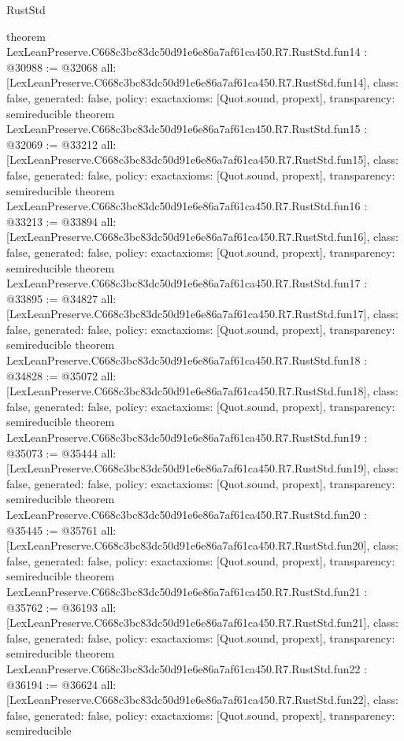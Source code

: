 \begin{lexlean}{RustStd}
\begin{coremodule}
{}
theorem LexLeanPreserve.C668c3bc83dc50d91e6e86a7af61ca450.R7.RustStd.fun14 : @30988 := @32068 {
  all: [LexLeanPreserve.C668c3bc83dc50d91e6e86a7af61ca450.R7.RustStd.fun14],
  class: false,
  generated: false,
  policy: exact{axioms: [Quot.sound, propext]},
  transparency: semireducible
}
theorem LexLeanPreserve.C668c3bc83dc50d91e6e86a7af61ca450.R7.RustStd.fun15 : @32069 := @33212 {
  all: [LexLeanPreserve.C668c3bc83dc50d91e6e86a7af61ca450.R7.RustStd.fun15],
  class: false,
  generated: false,
  policy: exact{axioms: [Quot.sound, propext]},
  transparency: semireducible
}
theorem LexLeanPreserve.C668c3bc83dc50d91e6e86a7af61ca450.R7.RustStd.fun16 : @33213 := @33894 {
  all: [LexLeanPreserve.C668c3bc83dc50d91e6e86a7af61ca450.R7.RustStd.fun16],
  class: false,
  generated: false,
  policy: exact{axioms: [Quot.sound, propext]},
  transparency: semireducible
}
theorem LexLeanPreserve.C668c3bc83dc50d91e6e86a7af61ca450.R7.RustStd.fun17 : @33895 := @34827 {
  all: [LexLeanPreserve.C668c3bc83dc50d91e6e86a7af61ca450.R7.RustStd.fun17],
  class: false,
  generated: false,
  policy: exact{axioms: [Quot.sound, propext]},
  transparency: semireducible
}
theorem LexLeanPreserve.C668c3bc83dc50d91e6e86a7af61ca450.R7.RustStd.fun18 : @34828 := @35072 {
  all: [LexLeanPreserve.C668c3bc83dc50d91e6e86a7af61ca450.R7.RustStd.fun18],
  class: false,
  generated: false,
  policy: exact{axioms: [Quot.sound, propext]},
  transparency: semireducible
}
theorem LexLeanPreserve.C668c3bc83dc50d91e6e86a7af61ca450.R7.RustStd.fun19 : @35073 := @35444 {
  all: [LexLeanPreserve.C668c3bc83dc50d91e6e86a7af61ca450.R7.RustStd.fun19],
  class: false,
  generated: false,
  policy: exact{axioms: [Quot.sound, propext]},
  transparency: semireducible
}
theorem LexLeanPreserve.C668c3bc83dc50d91e6e86a7af61ca450.R7.RustStd.fun20 : @35445 := @35761 {
  all: [LexLeanPreserve.C668c3bc83dc50d91e6e86a7af61ca450.R7.RustStd.fun20],
  class: false,
  generated: false,
  policy: exact{axioms: [Quot.sound, propext]},
  transparency: semireducible
}
theorem LexLeanPreserve.C668c3bc83dc50d91e6e86a7af61ca450.R7.RustStd.fun21 : @35762 := @36193 {
  all: [LexLeanPreserve.C668c3bc83dc50d91e6e86a7af61ca450.R7.RustStd.fun21],
  class: false,
  generated: false,
  policy: exact{axioms: [Quot.sound, propext]},
  transparency: semireducible
}
theorem LexLeanPreserve.C668c3bc83dc50d91e6e86a7af61ca450.R7.RustStd.fun22 : @36194 := @36624 {
  all: [LexLeanPreserve.C668c3bc83dc50d91e6e86a7af61ca450.R7.RustStd.fun22],
  class: false,
  generated: false,
  policy: exact{axioms: [Quot.sound, propext]},
  transparency: semireducible
}
\end{coremodule}
\end{lexlean}
